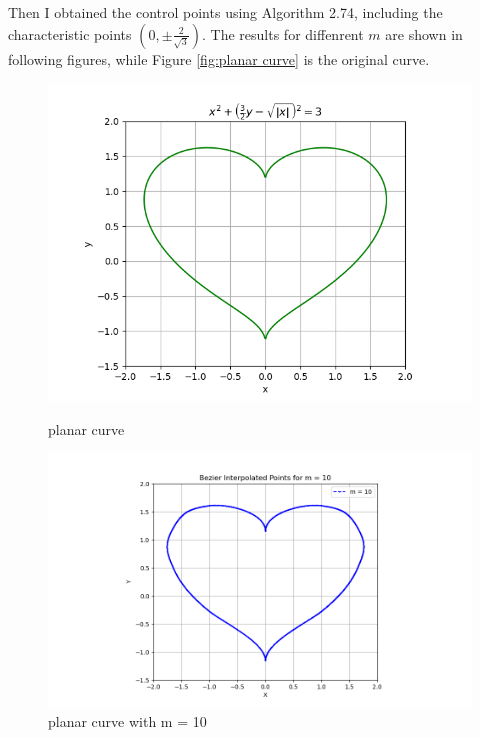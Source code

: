 \documentclass[a4paper]{article}
\begin{document}
Then I obtained the control points using Algorithm 2.74, including the characteristic points \((0, \pm \frac{2}{\sqrt{3}})\). The results for diffenrent \(m\) are shown in following figures, while Figure \ref{fig:planar curve} is the original curve.
\begin{figure}[ht]
  \centering
  \begin{minipage}[b]{0.45\textwidth}
    \centering
    \includegraphics[width=\textwidth]{figures/bezier0.png}
    \caption{planar curve}
    \label{fig:planar curve}
  \end{minipage}
  \hfill
  \begin{minipage}[b]{0.45\textwidth}
    \centering
    \includegraphics[width=\textwidth]{figures/bezier1.png}
    \caption{planar curve with m = 10}
    \label{fig:bezierm10}
  \end{minipage}
  \vfill
  \begin{minipage}[b]{0.45\textwidth}

\end{minipage}
\end{figure}
\end{document}
